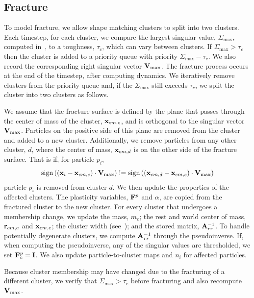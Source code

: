\documentclass[review]{acmsiggraph}
\begin{document}
\subsection{Fracture}
\label{sec:Fracture}
To model fracture, we allow shape matching clusters to split into two clusters.  Each timestep, for each cluster,
we compare the largest singular value, $\Sigma_{\max}$, computed in~, to a toughness, $\tau_c$, which
can vary between clusters.  
If $\Sigma_{\max} > \tau_c$ then the cluster is added to a priority queue with priority $\Sigma_{\max} - \tau_c$.  We also
record the corresponding right singular vector $\mathit{\mathbf{V}}_{\max}$.  The fracture process occurs 
at the end of the timestep, after computing dynamics.  We iteratively remove
clusters from the priority queue and, if the $\Sigma_{\max}$ still exceeds $\tau_c$, we split the cluster into two clusters
as follows.

We assume that the fracture surface is defined by the plane that passes through the center of mass of the 
cluster, $\mathit{\mathbf{x}}_{cm,c}$, and is orthogonal to the singular vector $\mathit{\mathbf{V}}_{\max}$.  Particles on the positive%
 side of this plane are removed from the cluster and added to a new cluster.  Additionally, we remove particles 
from any other cluster, $d$, where the center of mass, $\mathit{\mathbf{x}}_{cm,d}$ is on the other side of the fracture surface.
That is if, for particle $p_i$,
\begin{equation}
\mathrm{sign}\left(\left(\mathit{\mathbf{x}}_i-\mathit{\mathbf{x}}_{cm,c}\right)\cdot \mathit{\mathbf{V}}_{\max}\right) \mathrel{!}=
\mathrm{sign}\left(\left(\mathit{\mathbf{x}}_{cm,d}-\mathit{\mathbf{x}}_{cm,c}\right)\cdot \mathit{\mathbf{V}}_{\max}\right)
\end{equation}
particle $p_i$ is removed from cluster $d$.  We then update the properties of the affected clusters.
The plasticity variables, $\mathit{\mathbf{F}}^p$ and $\alpha$, are copied from the fractured cluster to the new cluster.
For every cluster that undergoes a membership change, we update the mass, $m_c$; the 
rest and world center of mass, $\mathit{\mathbf{r}}_{cm,c}$ and $\mathit{\mathbf{x}}_{cm,c}$; the cluster width (see~\cite{Bargteil:2014:SLF});
and the stored matrix, $\mathit{\mathbf{A}}_{rr}^{-1}$.  To handle potentially degenerate clusters, we compute $\mathit{\mathbf{A}}_{rr}^{-1}$
through the pseudoinverse.  If, when computing the pseudoinverse, any of the singular values are thresholded,
we set $\mathit{\mathbf{F}}_c^p = \mathit{\mathbf{I}}$.  We also update particle-to-cluster maps and $n_i$ for affected particles.

Because cluster membership may have changed due to the fracturing of a different cluster, we verify that 
$\Sigma_{\max} > \tau_c$ before fracturing and also recompute $\mathit{\mathbf{V}}_{\max}$.
\end{document}
